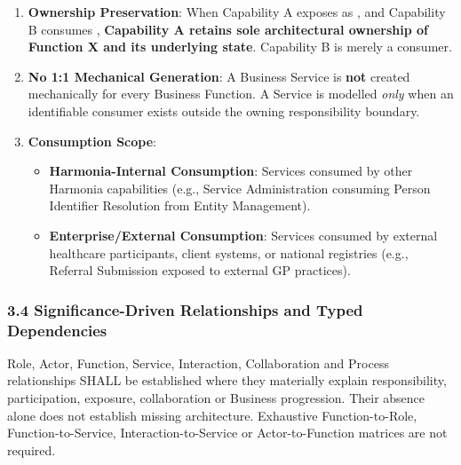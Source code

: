 \begin{enumerate}

\item 
\textbf{Ownership Preservation}: When Capability A exposes \texttt{} as \texttt{}, and Capability B consumes \texttt{}, \textbf{Capability A retains sole architectural ownership of Function X and its underlying state}. Capability B is merely a consumer.



\item 
\textbf{No 1:1 Mechanical Generation}: A Business Service is \textbf{not} created mechanically for every Business Function. A Service is modelled \emph{only} when an identifiable consumer exists outside the owning responsibility boundary.



\item 
\textbf{Consumption Scope}:


\begin{itemize}

\item 
\textbf{Harmonia-Internal Consumption}: Services consumed by other Harmonia capabilities (e.g., Service Administration consuming Person Identifier Resolution from Entity Management).



\item 
\textbf{Enterprise/\allowbreak{}External Consumption}: Services consumed by external healthcare participants, client systems, or national registries (e.g., Referral Submission exposed to external GP practices).



\end{itemize}


\end{enumerate}
\label{rad:metamodel:155}
\subsubsection*{3.4 Significance-Driven Relationships and Typed Dependencies}
\label{rad:metamodel:157}

Role, Actor, Function, Service, Interaction, Collaboration and Process relationships SHALL be established where they materially explain responsibility, participation, exposure, collaboration or Business progression. Their absence alone does not establish missing architecture. Exhaustive Function-to-Role, Function-to-Service, Interaction-to-Service or Actor-to-Function matrices are not required.

